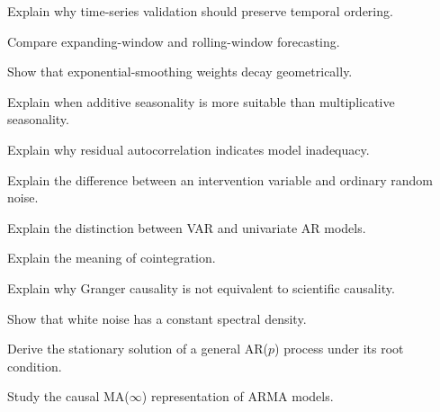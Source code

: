 \begin{exercise}[3]
Explain why time-series validation should preserve temporal ordering.
\end{exercise}

\begin{exercise}[3]
Compare expanding-window and rolling-window forecasting.
\end{exercise}

\begin{exercise}[3]
Show that exponential-smoothing weights decay geometrically.
\end{exercise}

\begin{exercise}[3]
Explain when additive seasonality is more suitable than multiplicative
seasonality.
\end{exercise}

\begin{exercise}[3]
Explain why residual autocorrelation indicates model inadequacy.
\end{exercise}

\begin{exercise}[3]
Explain the difference between an intervention variable and ordinary
random noise.
\end{exercise}

\begin{exercise}[3]
Explain the distinction between VAR and univariate AR models.
\end{exercise}

\begin{exercise}[3]
Explain the meaning of cointegration.
\end{exercise}

\begin{exercise}[3]
Explain why Granger causality is not equivalent to scientific causality.
\end{exercise}

\begin{exercise}[3]
Show that white noise has a constant spectral density.
\end{exercise}

\begin{exercise}[4]
Derive the stationary solution of a general AR(\(p\)) process under its
root condition.
\end{exercise}

\begin{exercise}[4]
Study the causal MA(\(\infty\)) representation of ARMA models.
\end{exercise}

